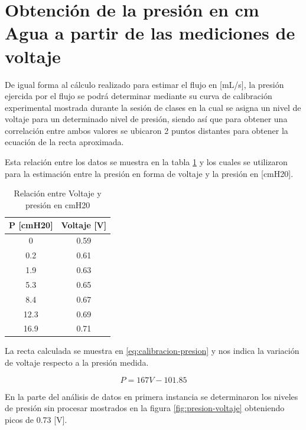 \documentclass[conference]{IEEEtran}
\begin{document}
	\section{Obtención de la presión en cm Agua a partir de las mediciones de voltaje}
	
	De igual forma al cálculo realizado para estimar el flujo en [mL/s], la presión ejercida por el flujo se podrá determinar mediante su curva de calibración experimental mostrada durante la sesión de clases en la cual se asigna un nivel de voltaje para un determinado nivel de presión, siendo así que para obtener una correlación entre ambos valores se ubicaron 2 puntos distantes para obtener la ecuación de la recta aproximada.
	
	Esta relación entre los datos se muestra en la tabla \ref{tab:mediciones-presion} y los cuales se utilizaron para la estimación entre la presión en forma de voltaje y la presión en [cmH20].
	
	\begin{table}[]
		\centering
		\begin{tabular}{|c|c|}
			\hline
			\textbf{P {[}cmH20{]}} & \textbf{Voltaje {[}V{]}} \\ \hline
			0                      & 0.59                     \\ \hline
			0.2                    & 0.61                     \\ \hline
			1.9                    & 0.63                     \\ \hline
			5.3                    & 0.65                     \\ \hline
			8.4                    & 0.67                     \\ \hline
			12.3                   & 0.69                     \\ \hline
			16.9                   & 0.71                     \\ \hline
		\end{tabular}
		\caption{Relación entre Voltaje y presión en cmH20}
		\label{tab:mediciones-presion}
	\end{table}
	
	La recta calculada se muestra en \ref{eq:calibracion-presion} y nos indica la variación de voltaje respecto a la presión medida.
	
	\begin{equation}
		P = 167V - 101.85
		\label{eq:calibracion-presion}
	\end{equation}
	
	En la parte del análisis de datos en primera instancia se determinaron los niveles de 
	presión sin procesar mostrados en la figura \ref{fig:presion-voltaje} obteniendo picos de 0.73 [V].
	
\end{document}
